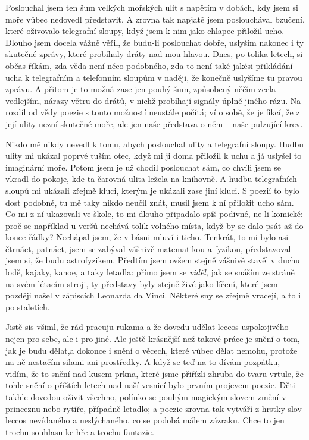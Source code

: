 Poslouchal jsem ten šum velkých mořských ulit s napětím v dobách, kdy jsem si moře vůbec nedovedl představit. A zrovna tak napjatě jsem poslouchával bzučení, které oživovalo telegrafní sloupy, když jsem k nim jako chlapec přiložil ucho. Dlouho jsem docela vážně věřil, že budu-li poslouchat dobře, uslyším nakonec i ty skutečné zprávy, které probíhaly dráty nad mou hlavou. Dnes, po tolika letech, si občas říkám, zda věda není něco podobného, zda to není také jakési přikládání ucha k telegrafním a telefonním sloupům v naději, že konečně uslyšíme tu pravou zprávu. A přitom je to možná zase jen pouhý šum, způsobený něčím zcela vedlejším, nárazy větru do drátů, v nichž probíhají signály úplně jiného rázu. Na rozdíl od vědy poezie s touto možností neustále počítá; ví o sobě, že je fikcí, že z její ulity nezní skutečné moře, ale jen naše představa o něm – naše pulzující krev.

Nikdo mě nikdy nevedl k tomu, abych poslouchal ulity a telegrafní sloupy. Hudbu ulity mi ukázal poprvé tuším otec, když mi ji doma přiložil k uchu a já uslyšel to imaginární moře. Potom jsem je už chodil poslouchat sám, co chvíli jsem se vkradl do pokoje, kde ta čarovná ulita ležela na knihovně. A hudbu telegrafních sloupů mi ukázali zřejmě kluci, kterým je ukázali zase jiní kluci. S poezií to bylo dost podobné, tu mě taky nikdo neučil znát, musil jsem k ní přiložit ucho sám. Co mi z ní ukazovali ve škole, to mi dlouho připadalo spíš podivné, ne-li komické: proč se například u veršů nechává tolik volného místa, když by se dalo psát až do konce řádky? Nechápal jsem, že v básni mluví i ticho. Tenkrát, to mi bylo asi čtrnáct, patnáct, jsem se zabýval vášnivě matematikou a fyzikou, představoval jsem si, že budu astrofyzikem. Předtím jsem ovšem stejně vášnivě stavěl v duchu lodě, kajaky, kanoe, a taky letadla: přímo jsem se \textit{viděl}, jak se snáším ze stráně na svém létacím stroji, ty představy byly stejně živé jako líčení, které jsem později našel v zápiscích Leonarda da Vinci. Některé sny se zřejmě vracejí, a to i po staletích.

Jistě sis všiml, že rád pracuju rukama a že dovedu udělat leccos uspokojivého nejen pro sebe, ale i pro jiné. Ale ještě krásnější než takové práce je snění o tom, jak je budu dělat,a dokonce i snění o věcech, které vůbec dělat nemohu, protože na ně nestačím silami ani prostředky. A když se teď na to dívám pozpátku, vidím, že to snění nad kusem prkna, které jsme přiřízli zhruba do tvaru vrtule, že tohle snění o příštích letech nad naší vesnicí bylo prvním projevem poezie. Děti takhle dovedou oživit všechno, polínko se pouhým magickým slovem změní v princeznu nebo rytíře, případně letadlo; a poezie zrovna tak vytváří z hrstky slov leccos nevídaného a neslýchaného, co se podobá málem zázraku. Chce to jen trochu souhlasu ke hře a trochu fantazie.

